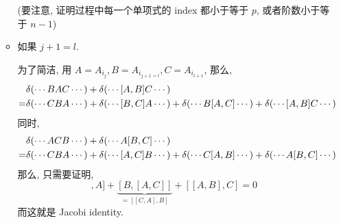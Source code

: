 \begin{itemize}
\begin{tcolorbox}[title=proof:]
\begin{itemize}
			(要注意, 证明过程中每一个单项式的 index 都小于等于 $p$, 或者阶数小于等于 $n - 1$)
			
			\item 如果 $j + 1 = l$.
			
			为了简洁, 用 $A = A_{i_j}, B = A_{i_{j + 1 = l}}, C = A_{i_{l + 1}}$, 那么,
			\begin{align}
				& \delta(\cdots B A C \cdots) + \delta(\cdots [A, B] C \cdots) \notag \\
				=& \delta(\cdots C B A \cdots) + \delta(\cdots [B, C] A \cdots) + \delta(\cdots B [A, C] \cdots) + \delta(\cdots [A, B] C \cdots)
			\end{align}
			同时,
			\begin{align}
				& \delta(\cdots A C B \cdots) + \delta(\cdots A [B, C] \cdots) \notag \\
				=& \delta(\cdots C B A \cdots) + \delta(\cdots [A, C] B \cdots) + \delta(\cdots C [A, B] \cdots) + \delta(\cdots A [B, C] \cdots)
			\end{align}
			那么, 只需要证明,
			\begin{equation}
				[[B, C], A] + \underbrace{[B, [A, C]]}_{= [[C, A], B]} + [[A, B], C] = 0
			\end{equation}
			而这就是 Jacobi identity.
		\end{itemize}
	\end{tcolorbox}
\end{itemize}

